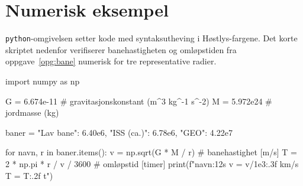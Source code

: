 \documentclass[11pt]{article}
\begin{document}
\section{Numerisk eksempel}

\verb|python|-omgivelsen setter kode med syntaksutheving i Høstlys-fargene. Det korte skriptet nedenfor verifiserer banehastigheten og omløpstiden fra oppgave~\ref{opg:bane} numerisk for tre representative radier.

\begin{python}
import numpy as np

G = 6.674e-11   # gravitasjonskonstant  (m^3 kg^-1 s^-2)
M = 5.972e24    # jordmasse             (kg)

baner = {"Lav bane":   6.40e6,
         "ISS (ca.)":  6.78e6,
         "GEO":        4.22e7}

for navn, r in baner.items():
    v = np.sqrt(G * M / r)           # banehastighet  [m/s]
    T = 2 * np.pi * r / v / 3600    # omløpstid      [timer]
    print(f"{navn:12s}  v = {v/1e3:.3f} km/s   T = {T:.2f} t")
\end{python}
\end{document}
